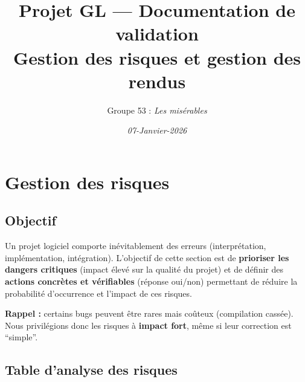 \documentclass[11pt,a4paper]{article}
\title{Projet GL --- Documentation de validation\\
Gestion des risques et gestion des rendus}
\author{Groupe 53 : \textit{Les misérables}}
\date{\textit{07-Janvier-2026}}
\begin{document}
\maketitle

\section{Gestion des risques}

\subsection{Objectif}
Un projet logiciel comporte inévitablement des erreurs (interprétation, implémentation, intégration).
L'objectif de cette section est de \textbf{prioriser les dangers critiques} (impact élevé sur la qualité du
projet) et de définir des \textbf{actions concrètes et vérifiables} (réponse oui/non) permettant de réduire
la probabilité d'occurrence et l'impact de ces risques.

\vspace{0.3em}
\noindent \textbf{Rappel :} certains bugs peuvent être rares mais coûteux (compilation cassée).
Nous privilégions donc les risques à \textbf{impact fort}, même si leur correction est ``simple''.

\subsection{Table d'analyse des risques}

\renewcommand\theadalign{tl}
\renewcommand\cellalign{tl}
\end{document}

